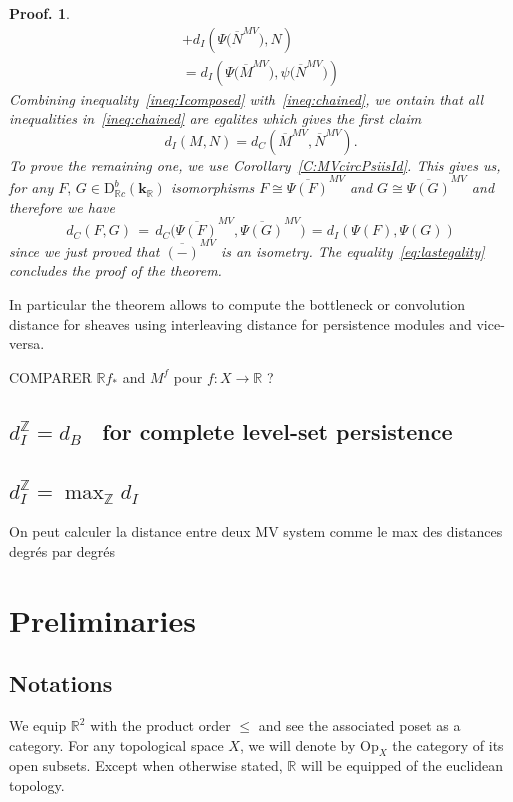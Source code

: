 \documentclass[a4paper, english, 11pt]{article}
\newcommand{\kk}[0]{\textbf{k}}
\newcommand{\0}{\vec{0}}
\newcommand{\R}[0]{\mathbb{R}}
\newcommand{\Z}[0]{\mathbb{Z}}
\newcommand{\D}[0]{\text{D}}
\newcommand{\Op}[0]{\text{Op}}
\newtheorem*{pf}{Proof.} }
\begin{document}
\begin{pf}
\begin{multline}
+ d_I(\Psi\big(\overline{N}^{MV} \big), N)\\ 
= d_I(\Psi\big(\overline{M}^{MV} \big), \psi\big(\overline{N}^{MV} \big))
 \end{multline}
Combining inequality~\eqref{ineq:Icomposed} with~\eqref{ineq:chained}, we ontain that all inequalities in~\eqref{ineq:chained} are egalites which gives the first claim 
$$d_I(M, N) = d_C (\overline{M}^{MV}, \overline{N}^{MV}).$$
To prove the remaining one, we use Corollary~\ref{C:MVcircPsiisId}. 
This gives us, for any $F, \, G\in  \D^b_{\R c}(\kk_\R)$ isomorphisms 
$F\cong \overline{\Psi(F)}^{MV}$ and $G\cong \overline{\Psi(G)}^{MV}$ and therefore we have
\begin{equation}\label{eq:lastegality}
 d_C(F,G) \, = \, d_C\big( \overline{\Psi(F)}^{MV}, \overline{\Psi(G)}^{MV}\big) \, =
 d_I(\Psi(F), \Psi(G))
\end{equation}
since we just proved that $\overline{(-)}^{MV}$ is an isometry. The equality~\eqref{eq:lastegality} concludes the proof of the theorem.
\end{pf}

In particular the theorem allows to compute the bottleneck or convolution distance for sheaves using interleaving distance for persistence modules and vice-versa.

COMPARER $\mathbb{R}f_*$ and $M^f$ pour $f:X\to \R$ ?

\subsection{\og $d_I^\Z = d_B$ \fg ~for complete level-set persistence}

\subsection{\og $d_I^\Z = \max_\Z d_I$\fg~}
On peut calculer la distance entre deux MV system comme le max des distances degrés par degrés




\section{Preliminaries}

\subsection{Notations}

We equip $\R^2$ with the product order $\leq$ and see the associated poset as a category. For any topological space $X$, we will denote by $\Op_X$ the category of its open subsets. Except when otherwise stated, $\R$ will be equipped of the euclidean topology. 
\end{document}
